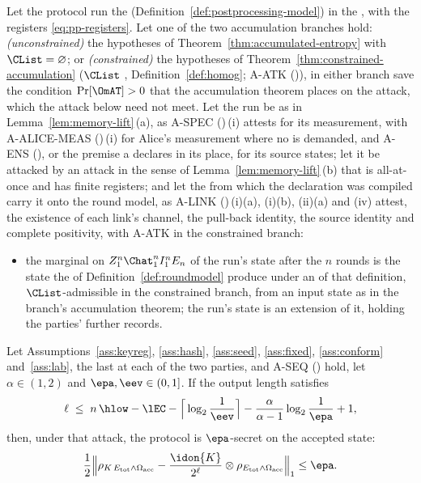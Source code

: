 \begin{theorem}\label{thm:keylength}
Let the protocol run the 
(Definition~\ref{def:postprocessing-model}) in the
, with the registers
\eqref{eq:pp-registers}. Let one of the two accumulation branches hold:
\emph{(unconstrained)} the hypotheses of
Theorem~\ref{thm:accumulated-entropy} with $\CList=\varnothing$; or
\emph{(constrained)} the hypotheses of
Theorem~\ref{thm:constrained-accumulation} ($\CList$
, Definition~\ref{def:homog};
A-ATK ()), in either branch save the
condition $\Pr[\OmAT]>0$ that the accumulation theorem places on the
attack, which the attack below need not meet. Let the run be as in
Lemma~\ref{lem:memory-lift}\,(a), as A-SPEC ()\,(i)
attests for its measurement, with A-ALICE-MEAS
()\,(i) for Alice's measurement where
no  is demanded, and A-ENS
(), or the
premise a  declares in its place, for its source states;
let it be attacked by an attack in the sense of
Lemma~\ref{lem:memory-lift}\,(b) that is all-at-once and has finite
registers; and let the  from which the declaration was
compiled carry it onto the round model, as A-LINK
()\,(i)(a), (i)(b), (ii)(a) and (iv) attest,
the existence of each link's channel, the pull-back identity, the source
identity and complete positivity, with A-ATK in the constrained branch:
\begin{itemize}[leftmargin=2.4em]
\item[(H-CHAIN)] the marginal on $Z_1^n\Chat_1^nI_1^nE_n$ of the run's state
  after the $n$ rounds is the state the
   of Definition~\ref{def:roundmodel}
  produce under an  of that definition,
  $\CList$-admissible in the constrained branch, from an input state as in
  the branch's accumulation theorem; the run's state is an extension of it,
  holding the parties' further records.
\end{itemize}
Let Assumptions~\ref{ass:keyreg}, \ref{ass:hash}, \ref{ass:seed},
\ref{ass:fixed}, \ref{ass:conform} and~\ref{ass:lab}, the last at each of
the two parties, and A-SEQ () hold, let
$\alpha\in(1,2)$ and $\epa,\eev\in(0,1]$. If the output length satisfies
\begin{equation}\label{eq:keylength}
  \ell\;\le\;n\,\hlow-\lEC-\Big\lceil\log_2\frac1{\eev}\Big\rceil
  -\frac{\alpha}{\alpha-1}\log_2\frac1{\epa}+1,
\end{equation}
then, under that attack, the protocol is $\epa$-secret on the accepted
state:
\begin{equation*}
  \frac12\Big\|\rho_{K\,E_{\mathrm{tot}}\wedge\Omega_{\mathrm{acc}}}
  -\frac{\idon{K}}{2^{\ell}}\otimes
  \rho_{E_{\mathrm{tot}}\wedge\Omega_{\mathrm{acc}}}\Big\|_1\le\epa .
\end{equation*}
\end{theorem}

